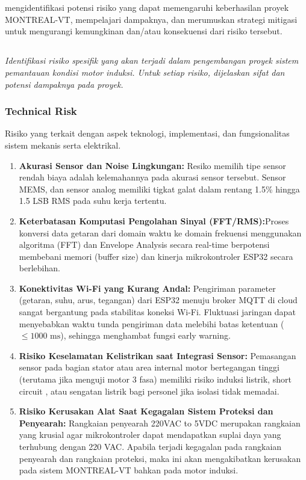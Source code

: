 \documentclass{elsinta}
\begin{document}
\section{\RiskAssessmentTitle}

mengidentifikasi potensi risiko yang dapat memengaruhi keberhasilan proyek MONTREAL-VT, mempelajari dampaknya, dan merumuskan strategi mitigasi untuk mengurangi kemungkinan dan/atau konsekuensi dari risiko tersebut.

\subsection{\TechFinancialRiskTitle}
\textit{Identifikasi risiko spesifik yang akan terjadi dalam pengembangan proyek sistem pemantauan kondisi motor induksi. Untuk setiap risiko, dijelaskan sifat dan potensi dampaknya pada proyek. }

\subsubsection*{Technical Risk}
Risiko yang terkait dengan aspek teknologi, implementasi, dan fungsionalitas sistem mekanis serta elektrikal.
\begin{enumerate}
    \item \textbf{Akurasi Sensor dan Noise Lingkungan:} Resiko memilih tipe sensor rendah biaya adalah kelemahannya pada akurasi sensor tersebut. Sensor MEMS, dan sensor analog memiliki tigkat galat dalam rentang 1.5\% hingga 1.5 LSB RMS pada suhu kerja tertentu.
    \item \textbf{Keterbatasan Komputasi Pengolahan Sinyal (FFT/RMS):}Proses konversi data getaran dari domain waktu ke domain frekuensi menggunakan algoritma  (FFT) dan Envelope Analysis secara real-time berpotensi membebani memori (buffer size) dan kinerja mikrokontroler ESP32 secara berlebihan. 
    \item \textbf{Konektivitas Wi-Fi yang Kurang Andal:} Pengiriman parameter (getaran, suhu, arus, tegangan) dari ESP32 menuju broker MQTT di cloud sangat bergantung pada stabilitas koneksi Wi-Fi. Fluktuasi jaringan dapat menyebabkan waktu tunda pengiriman data melebihi batas ketentuan ($\le1000\text{ ms}$), sehingga menghambat fungsi early warning. 
    \item \textbf{Risiko Keselamatan Kelistrikan saat Integrasi Sensor:} Pemasangan sensor pada bagian stator atau area internal motor bertegangan tinggi (terutama jika menguji motor 3 fasa) memiliki risiko induksi listrik, { short circuit } , atau sengatan listrik bagi personel jika isolasi tidak memadai. 
    \item \textbf{Risiko Kerusakan Alat Saat Kegagalan Sistem Proteksi dan Penyearah:} Rangkaian penyearah 220VAC to 5VDC merupakan rangkaian yang krusial agar mikrokontroler dapat mendapatkan suplai daya yang terhubung dengan 220 VAC. Apabila terjadi kegagalan pada rangkaian penyearah dan rangkaian proteksi, maka ini akan mengakibatkan kerusakan pada sistem MONTREAL-VT bahkan pada motor induksi.
\end{enumerate}
\end{document}
